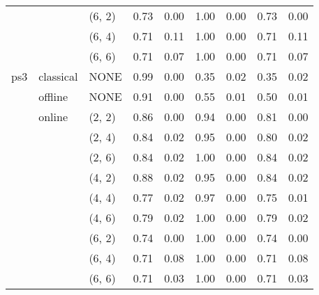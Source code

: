\begin{tabular}{lllrrrrrr}
    &        & (6, 2) &     0.73 & 0.00 &     1.00 & 0.00 &  0.73 & 0.00 \\
    &        & (6, 4) &     0.71 & 0.11 &     1.00 & 0.00 &  0.71 & 0.11 \\
    &        & (6, 6) &     0.71 & 0.07 &     1.00 & 0.00 &  0.71 & 0.07 \\
ps3 & classical & NONE &     0.99 & 0.00 &     0.35 & 0.02 &  0.35 & 0.02 \\
    & offline & NONE &     0.91 & 0.00 &     0.55 & 0.01 &  0.50 & 0.01 \\
    & online & (2, 2) &     0.86 & 0.00 &     0.94 & 0.00 &  0.81 & 0.00 \\
    &        & (2, 4) &     0.84 & 0.02 &     0.95 & 0.00 &  0.80 & 0.02 \\
    &        & (2, 6) &     0.84 & 0.02 &     1.00 & 0.00 &  0.84 & 0.02 \\
    &        & (4, 2) &     0.88 & 0.02 &     0.95 & 0.00 &  0.84 & 0.02 \\
    &        & (4, 4) &     0.77 & 0.02 &     0.97 & 0.00 &  0.75 & 0.01 \\
    &        & (4, 6) &     0.79 & 0.02 &     1.00 & 0.00 &  0.79 & 0.02 \\
    &        & (6, 2) &     0.74 & 0.00 &     1.00 & 0.00 &  0.74 & 0.00 \\
    &        & (6, 4) &     0.71 & 0.08 &     1.00 & 0.00 &  0.71 & 0.08 \\
    &        & (6, 6) &     0.71 & 0.03 &     1.00 & 0.00 &  0.71 & 0.03 \\
\bottomrule
\end{tabular}
